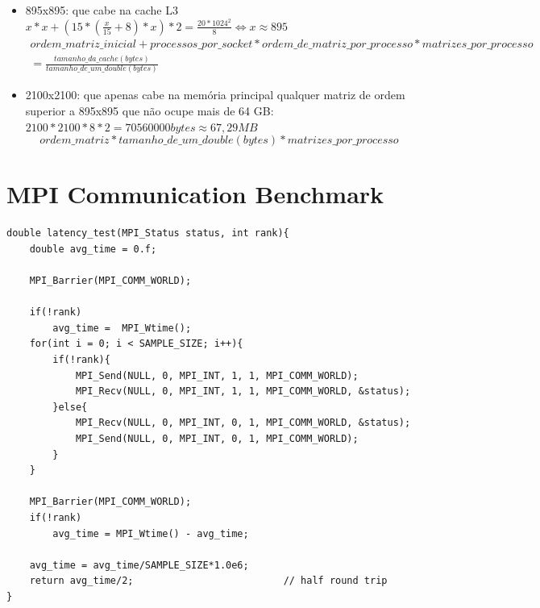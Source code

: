 \documentclass{article}
\begin{document}
\begin{appendices}
\begin{itemize}
    \item 895x895: que cabe na cache L3 \newline
          $ x*x + (15*(\frac{x}{15} + 8)*x) * 2 = \frac{20*1024^2}{8} \Leftrightarrow x \approx 895 $ \newline 
          \begin{equation}
            \begin{split}
                ordem\_matriz\_inicial + processos\_por\_socket * ordem\_de\_matriz\_por\_processo * matrizes\_por\_processo \\ 
                = \frac{tamanho\_da\_cache(bytes)}{tamanho\_de\_um\_double(bytes)}
            \end{split}
          \end{equation}
    \item 2100x2100: que apenas cabe na memória principal \newline 
          qualquer matriz de ordem superior a 895x895 que não ocupe mais de 64 GB: \newline $2100*2100*8*2 = 70560000 bytes \approx 67,29 MB$ \newline
          \begin{equation}
            ordem\_matriz * tamanho\_de\_um\_double(bytes) * matrizes\_por\_processo
          \end{equation}
\end{itemize} 

\section{MPI Communication Benchmark}
\label{pingpong_mpi}
\begin{verbatim}
double latency_test(MPI_Status status, int rank){
    double avg_time = 0.f;

    MPI_Barrier(MPI_COMM_WORLD);
    
    if(!rank)
        avg_time =  MPI_Wtime();
    for(int i = 0; i < SAMPLE_SIZE; i++){
        if(!rank){
            MPI_Send(NULL, 0, MPI_INT, 1, 1, MPI_COMM_WORLD);
            MPI_Recv(NULL, 0, MPI_INT, 1, 1, MPI_COMM_WORLD, &status);
        }else{
            MPI_Recv(NULL, 0, MPI_INT, 0, 1, MPI_COMM_WORLD, &status);
            MPI_Send(NULL, 0, MPI_INT, 0, 1, MPI_COMM_WORLD);
        }    
    }
    
    MPI_Barrier(MPI_COMM_WORLD);
    if(!rank)
        avg_time = MPI_Wtime() - avg_time;

    avg_time = avg_time/SAMPLE_SIZE*1.0e6;
    return avg_time/2;                          // half round trip
}


\end{verbatim}
\end{appendices}
\end{document}
